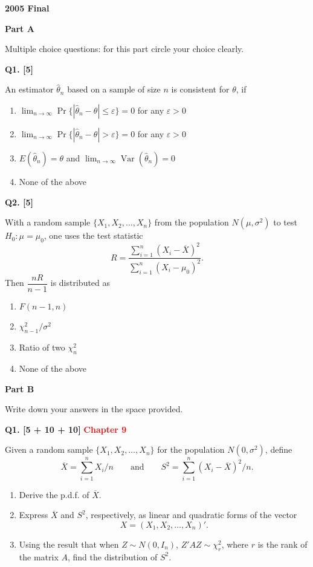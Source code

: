 \documentclass[11pt]{article}
\begin{document}
\begin{center}
    {\Large\bfseries 2005 Final}
\end{center}

\vspace{1em}

\begin{center}
\textbf{Part A}
\end{center}

Multiple choice questions: for this part circle your choice clearly.

\textbf{Q1. [5]}

An estimator $\hat\theta_n$ based on a sample of size $n$ is consistent for $\theta$, if
\begin{enumerate}
\item[(a)] $\displaystyle\lim_{n\to\infty}\Pr\{|\hat\theta_n-\theta|\leq\varepsilon\}=0$ for any $\varepsilon>0$
\item[(b)] $\displaystyle\lim_{n\to\infty}\Pr\{|\hat\theta_n-\theta|>\varepsilon\}=0$ for any $\varepsilon>0$
\item[(c)] $E(\hat\theta_n)=\theta$ and $\displaystyle\lim_{n\to\infty}\operatorname{Var}(\hat\theta_n)=0$
\item[(d)] None of the above
\end{enumerate}

\bigskip

\textbf{Q2. [5]}

With a random sample $\{X_1,X_2,\ldots,X_n\}$ from the population $N(\mu,\sigma^2)$ to test $H_0:\mu=\mu_0$, one uses the test statistic
\[
R=\frac{\sum_{i=1}^{n}(X_i-\overline X)^2}{\sum_{i=1}^{n}(X_i-\mu_0)^2}.
\]
Then $\dfrac{nR}{n-1}$ is distributed as
\begin{enumerate}
\item[(a)] $F(n-1,n)$
\item[(b)] $\chi^2_{n-1}/\sigma^2$
\item[(c)] Ratio of two $\chi^2_n$
\item[(d)] None of the above
\end{enumerate}

\bigskip

\begin{center}
\textbf{Part B}
\end{center}

Write down your answers in the space provided.

\textbf{Q1. [5 + 10 + 10]} \textbf{\textcolor{red}{Chapter 9}}

Given a random sample $\{X_1,X_2,\ldots,X_n\}$ for the population $N(0,\sigma^2)$, define
\[
\overline X=\sum_{i=1}^{n}X_i/n
\qquad\text{and}\qquad
S^2=\sum_{i=1}^{n}(X_i-\overline X)^2/n.
\]
\begin{enumerate}
\item[(a)] Derive the p.d.f. of $\overline X$.
\item[(b)] Express $\overline X$ and $S^2$, respectively, as linear and quadratic forms of the vector
\[
X=(X_1,X_2,\ldots,X_n)'.
\]
\item[(c)] Using the result that when $Z\sim N(0,I_n)$, $Z'AZ\sim\chi^2_r$, where $r$ is the rank of the matrix $A$, find the distribution of $S^2$.
\end{enumerate}
\end{document}
